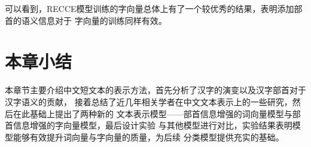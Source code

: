可以看到，RECCE模型训练的字向量总体上有了一个较优秀的结果，表明添加部首的语义信息对于
字向量的训练同样有效。
\section{本章小结}
本章节主要介绍中文短文本的表示方法，首先分析了汉字的演变以及汉字部首对于汉字语义的贡献，
接着总结了近几年相关学者在中文文本表示上的一些研究，然后在此基础上提出了两种新的
文本表示模型——部首信息增强的词向量模型与部首信息增强的字向量模型，最后设计实验
与其他模型进行对比，实验结果表明模型能够有效提升词向量与字向量的质量，为后续
分类模型提供充实的基础。